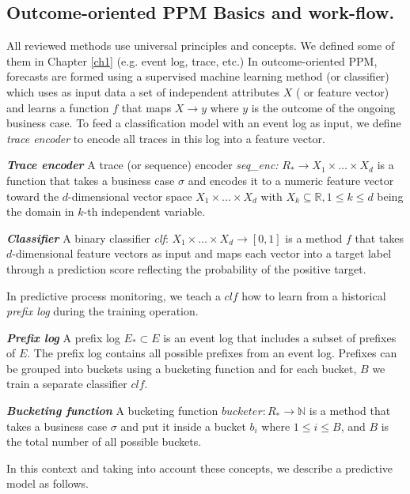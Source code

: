 \subsection{Outcome-oriented PPM Basics and work-flow.} \label{wf}
All reviewed methods use universal principles and concepts. We defined some of them in Chapter \ref{ch1} (e.g. event log, trace, etc.)
In outcome-oriented PPM, forecasts are formed using a supervised machine learning method (or classifier) which uses as input data a set of independent attributes $X$ ( or feature vector) and learns a function $f$ that maps $X \to y$ where $y$ is the outcome of the ongoing business case. To feed a classification model with an event log as input, we define \textit{trace encoder} to encode all traces in this log into a feature vector.

\begin{definition}{\textit{\textbf{Trace encoder}}}
	A trace (or sequence) encoder \textit{seq\_enc:} $R_* \to X_1 \times \dots \times X_d$ is a function that takes a business case $\sigma$ and encodes it to a numeric feature vector toward the  $d$-dimensional vector space  $X_1 \times \dots \times X_d$ with $X_k \subseteq \mathbb{R}, 1 \le k \le d $ being the domain in $k$-th independent variable. 	
\end{definition} 

\begin{definition}{\textit{\textbf{Classifier}}}
		A binary classifier \textit{clf}: $X_1 \times \dots \times X_d \to [0, 1]$ is a method $f$ that takes $d$-dimensional feature vectors as input and maps each vector into a target label through a prediction score reflecting the probability of the positive target. 		
\end{definition} 
In predictive process monitoring, we teach a $clf$ how to learn from a historical \textit{prefix log} during the training operation. 

\begin{definition}{\textit{\textbf{Prefix log}}}
	A prefix log $E_* \subset E$  is an event log that includes a subset of prefixes of $E$. The prefix log contains all possible prefixes from an event log.
	Prefixes can be grouped into buckets using a bucketing function and for each bucket, $B$ we train a separate classifier $clf$.		
\end{definition}

\begin{definition}{\textit{\textbf{Bucketing function}}}
	A bucketing function $bucketer: R_* \to \mathbb{N}$ is a method that takes a business case $\sigma$ and put it inside a bucket $b_i$ where $1 \le i \le B$, and $B$ is the total number of all possible buckets. 		
\end{definition}
In this context and taking into account these concepts, we describe a predictive model as follows. 

